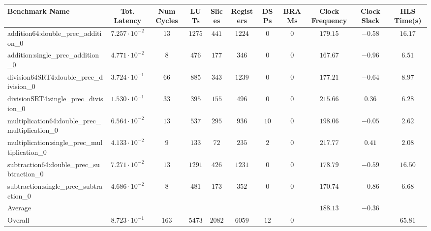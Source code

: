\begin{tabular}{|l|c|c|c|c|c|c|c|c|c|c|}
\hline
Benchmark Name                                   & Tot. Latency            & Num Cycles & LUTs     & Slices   & Registers & DSPs   & BRAMs & Clock Frequency & Clock Slack & HLS Time(s) \\
\hline
addition64:double\_prec\_addition\_0             & $ 7.257 \cdot 10^{-2} $ & $ 13     $ & $ 1275 $ & $ 441  $ & $ 1224  $ & $ 0  $ & $ 0 $ & $ 179.15      $ & $ -0.58   $ & $ 16.17   $ \\
addition:single\_prec\_addition\_0               & $ 4.771 \cdot 10^{-2} $ & $ 8      $ & $ 476  $ & $ 177  $ & $ 346   $ & $ 0  $ & $ 0 $ & $ 167.67      $ & $ -0.96   $ & $ 6.51    $ \\
division64SRT4:double\_prec\_division\_0         & $ 3.724 \cdot 10^{-1} $ & $ 66     $ & $ 885  $ & $ 343  $ & $ 1239  $ & $ 0  $ & $ 0 $ & $ 177.21      $ & $ -0.64   $ & $ 8.97    $ \\
divisionSRT4:single\_prec\_division\_0           & $ 1.530 \cdot 10^{-1} $ & $ 33     $ & $ 395  $ & $ 155  $ & $ 496   $ & $ 0  $ & $ 0 $ & $ 215.66      $ & $ 0.36    $ & $ 6.28    $ \\
multiplication64:double\_prec\_multiplication\_0 & $ 6.564 \cdot 10^{-2} $ & $ 13     $ & $ 537  $ & $ 295  $ & $ 936   $ & $ 10 $ & $ 0 $ & $ 198.06      $ & $ -0.05   $ & $ 2.62    $ \\
multiplication:single\_prec\_multiplication\_0   & $ 4.133 \cdot 10^{-2} $ & $ 9      $ & $ 133  $ & $ 72   $ & $ 235   $ & $ 2  $ & $ 0 $ & $ 217.77      $ & $ 0.41    $ & $ 2.08    $ \\
subtraction64:double\_prec\_subtraction\_0       & $ 7.271 \cdot 10^{-2} $ & $ 13     $ & $ 1291 $ & $ 426  $ & $ 1231  $ & $ 0  $ & $ 0 $ & $ 178.79      $ & $ -0.59   $ & $ 16.50   $ \\
subtraction:single\_prec\_subtraction\_0         & $ 4.686 \cdot 10^{-2} $ & $ 8      $ & $ 481  $ & $ 173  $ & $ 352   $ & $ 0  $ & $ 0 $ & $ 170.74      $ & $ -0.86   $ & $ 6.68    $ \\
\hline
Average                                          & $                     $ & $        $ & $      $ & $      $ & $       $ & $    $ & $   $ & $ 188.13      $ & $ -0.36   $ & $         $ \\
\hline
Overall                                          & $ 8.723 \cdot 10^{-1} $ & $ 163    $ & $ 5473 $ & $ 2082 $ & $ 6059  $ & $ 12 $ & $ 0 $ & $             $ & $         $ & $ 65.81   $ \\
\hline
\end{tabular}
